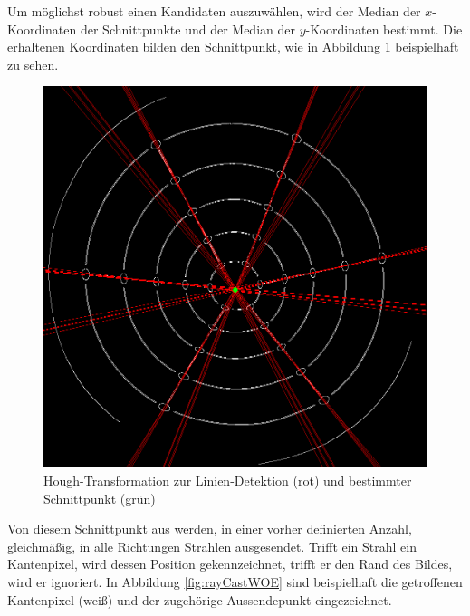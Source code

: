 Um möglichst robust einen Kandidaten auszuwählen, wird der Median der $x$-Koordinaten der Schnittpunkte und der Median der $y$-Koordinaten bestimmt. Die erhaltenen Koordinaten bilden den Schnittpunkt, wie in Abbildung \ref{fig:houghLines} beispielhaft zu sehen.

\begin{figure}[!htb]
	\centering
	\includegraphics[scale=.25]{images/houghLines.png}
	\caption{Hough-Transformation zur Linien-Detektion (rot) und bestimmter Schnittpunkt (grün) }
	\label{fig:houghLines}
\end{figure}

Von diesem Schnittpunkt aus werden, in einer vorher definierten Anzahl, gleichmäßig, in alle Richtungen Strahlen ausgesendet.
Trifft ein Strahl ein Kantenpixel, wird dessen Position gekennzeichnet, trifft er den Rand des Bildes, wird er ignoriert. In Abbildung \ref{fig:rayCastWOE} sind beispielhaft die getroffenen Kantenpixel (weiß) und der zugehörige Aussendepunkt eingezeichnet.

